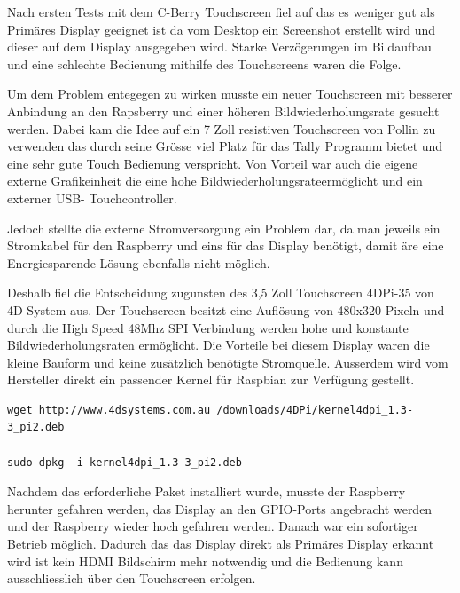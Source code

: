 \documentclass[11pt,a4paper]{article} %
\begin{document}
Nach ersten Tests mit dem C-Berry Touchscreen fiel auf das es weniger gut als Prim\"ares Display geeignet ist da vom Desktop ein Screenshot erstellt wird und dieser auf dem Display  ausgegeben wird. Starke Verz\"ogerungen im Bildaufbau und eine schlechte Bedienung mithilfe des Touchscreens waren die Folge.
\par
Um dem Problem entegegen zu wirken musste ein neuer Touchscreen mit besserer Anbindung an den Rapsberry und einer h\"oheren Bildwiederholungsrate gesucht werden. Dabei kam die Idee auf ein 7 Zoll resistiven Touchscreen von Pollin zu verwenden das durch seine Gr\"osse viel Platz f\"ur das Tally Programm bietet und eine sehr gute Touch Bedienung verspricht. Von Vorteil war auch die eigene externe Grafikeinheit die eine hohe Bildwiederholungsrateerm\"oglicht  und ein externer USB- Touchcontroller. 
\par
Jedoch stellte die externe Stromversorgung ein Problem dar, da man jeweils ein Stromkabel f\"ur den Raspberry und eins f\"ur das Display ben\"otigt, damit \"are eine Energiesparende L\"osung ebenfalls nicht m\"oglich.
\par
Deshalb fiel die Entscheidung zugunsten des 3,5 Zoll Touchscreen 4DPi-35 von 4D System aus. Der Touchscreen besitzt eine Aufl\"osung von 480x320 Pixeln und durch die High Speed 48Mhz SPI Verbindung werden hohe und konstante Bildwiederholungsraten erm\"oglicht.
Die Vorteile bei diesem Display waren die kleine Bauform und keine zus\"atzlich ben\"otigte Stromquelle. Ausserdem wird vom Hersteller direkt ein passender Kernel f\"ur Raspbian zur Verf\"ugung gestellt.
\begin{frame}

\begin{lstlisting}
wget http://www.4dsystems.com.au /downloads/4DPi/kernel4dpi_1.3-3_pi2.deb 

sudo dpkg -i kernel4dpi_1.3-3_pi2.deb
\end{lstlisting}

\end{frame}

 Nachdem das erforderliche Paket installiert wurde, musste der Raspberry herunter gefahren werden,  das Display an den GPIO-Ports angebracht werden und der Raspberry wieder hoch gefahren werden. Danach war ein sofortiger Betrieb m\"oglich. Dadurch das das Display direkt als Prim\"ares Display erkannt wird ist kein HDMI Bildschirm mehr notwendig und die Bedienung kann ausschliesslich \"uber den Touchscreen erfolgen.
\par
\end{document}
